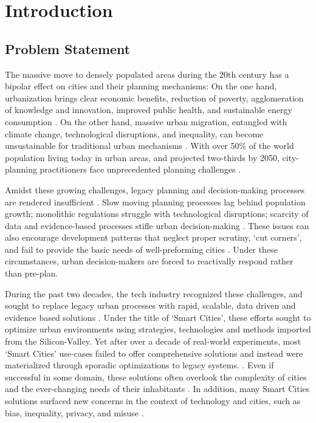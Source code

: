 % 


\section{Introduction}
\subsection{Problem Statement}

{The massive move to densely populated areas during the 20th century has a bipolar effect on cities and their planning mechanisms: On the one hand, urbanization brings clear economic benefits, reduction of poverty, agglomeration of knowledge and innovation, improved public health, and sustainable energy consumption \cite{Glaeser2011, reckien2017climate, banerjee2011companion}. On the other hand, massive urban migration, entangled with climate change, technological disruptions, and inequality, can become unsustainable for traditional urban mechanisms \cite{parnell2016defining, reckien2017climate}. With over 50\% of the world population living today in urban areas, and projected two-thirds by 2050, city-planning practitioners face unprecedented planning challenges \cite{united2018world, UnitedNationsHabitatIII2017}.} 

{Amidst these growing challenges, legacy planning and decision-making processes are rendered insufficient \cite{Ben-Joseph2004, green2019smart, gaffney2018smarter}. Slow moving planning processes lag behind population growth; monolithic regulations struggle with technological disruptions; scarcity of data and evidence-based processes stifle urban decision-making \cite{world2016inspiring, grauman1976orders, chen2014global}. These issues can also encourage development patterns that neglect proper scrutiny, `cut corners', and fail to provide the basic needs of well-preforming cities \cite{banerjee2011companion}. Under these circumstances, urban decision-makers are forced to reactivally respond rather than pre-plan.}

{During the past two decades, the tech industry recognized these challenges, and sought to replace legacy urban processes with rapid, scalable, data driven and evidence based solutions \cite{soderstrom2014smart}. Under the title of `Smart Cities', these efforts sought to optimize urban environments using strategies, technologies and methods imported from the Silicon-Valley. Yet after over a decade of real-world experiments, most `Smart Cities' use-cases failed to offer comprehensive solutions and instead were materialized through sporadic optimizations to legacy systems. \cite{green2019smart, gaffney2018smarter}. Even if successful in some domain, these solutions often overlook the complexity of cities and the ever-changing needs of their inhabitants \cite{gaffney2018smarter}. In addition, many Smart Cities solutions surfaced new concerns in the context of technology and cities, such as bias, inequality, privacy, and misuse \cite{green2019smart}.} 

